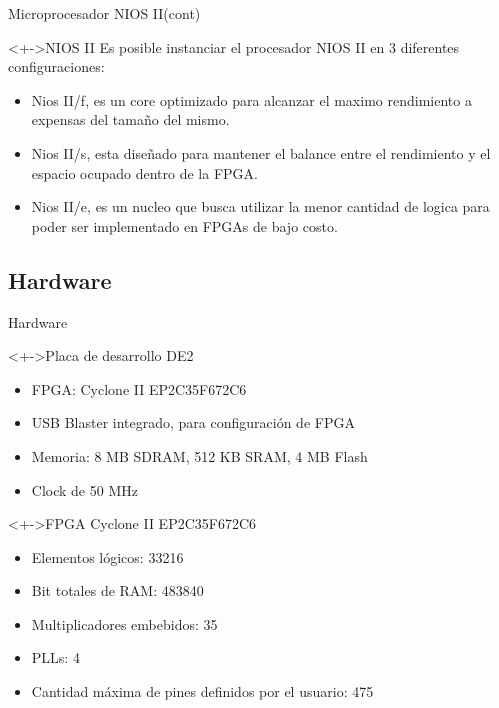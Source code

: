 \documentclass[xcolor=dvipsnames]{beamer}
\begin{document}
\begin{frame}{Microprocesador NIOS II(cont)}
\center
   \begin{block}<+->{NIOS II}
	Es posible instanciar el procesador NIOS II en 3 diferentes configuraciones:	
	

    \begin{itemize}
	\scriptsize
     	\item Nios II/f, es un core optimizado para alcanzar el maximo rendimiento a expensas del tamaño del mismo.
	\item Nios II/s, esta diseñado para mantener el balance entre el rendimiento y el espacio ocupado dentro de la FPGA.
	\item Nios II/e, es un nucleo que busca utilizar la menor cantidad de logica para poder ser implementado en FPGAs de bajo costo.
    \end{itemize}
  \end{block}
\end{frame}

\subsection{Hardware}
\begin{frame}{Hardware}
  \begin{block}<+->{Placa de desarrollo DE2} 	
    \begin{itemize}
      \scriptsize
     	\item FPGA: Cyclone II EP2C35F672C6
	\item USB Blaster integrado, para configuración de FPGA
	\item Memoria: 8 MB SDRAM, 512 KB SRAM, 4 MB Flash
	\item Clock de 50 MHz
     \end{itemize}
  \end{block}

  \begin{block}<+->{FPGA Cyclone II EP2C35F672C6} 	
    \begin{itemize}
      \scriptsize
     	\item Elementos lógicos: 33216
	\item Bit totales de RAM: 483840
	\item Multiplicadores embebidos: 35
	\item PLLs: 4
	\item Cantidad máxima de pines definidos por el usuario: 475
     \end{itemize}
  \end{block}
\end{frame}
\end{document}
